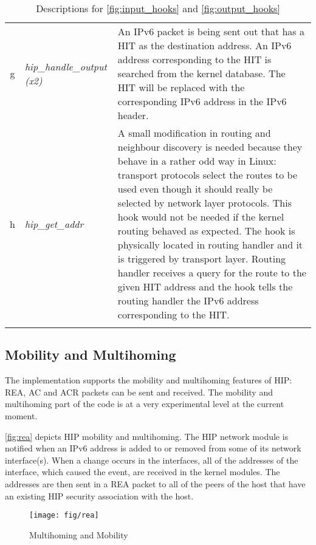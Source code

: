 \begin{longtable}{|c|p{}|p{}|}
g & \textit{hip\_handle\_output (x2)} &

An IPv6 packet is being sent out that has a HIT as the destination
address. An IPv6 address corresponding to the HIT is searched from the
kernel database. The HIT will be replaced with the corresponding IPv6
address in the IPv6 header. \\

h & \textit{hip\_get\_addr} &
  
A small modification in routing and neighbour discovery is needed
because they behave in a rather odd way in Linux: transport protocols
select the routes to be used even though it should really be selected
by network layer protocols. This hook would not be needed if the
kernel routing behaved as expected. The hook is physically located in
routing handler and it is triggered by transport layer. Routing
handler receives a query for the route to the given HIT address and the
hook tells the routing handler the IPv6 address corresponding to the
HIT.\\

\hline
\caption{Descriptions for \autoref{fig:input_hooks} and
\autoref{fig:output_hooks}}
\label{tbl:hook_descriptions}
\end{longtable}

\subsection{Mobility and Multihoming}
\label{sec:mobility_and_multihoming_architecture}

The implementation supports the mobility and multihoming features of
HIP: REA, AC and ACR packets can be sent and received. The mobility
and multihoming part of the code is at a very experimental level at
the current moment.

\autoref{fig:rea} depicts HIP mobility and multihoming. The HIP
network module is notified when an IPv6 address is added to or removed
from some of its network interface(s). When a change occurs in the
interfaces, all of the addresses of the interface, which caused the
event, are received in the kernel modules. The addresses are then sent
in a REA packet to all of the peers of the host that have an existing
HIP security association with the host.

\begin{figure}[hbt]
 \centering
 \texttt{[image: fig/rea]}
 \caption{Multihoming and Mobility}
 \label{fig:rea}
\end{figure}

